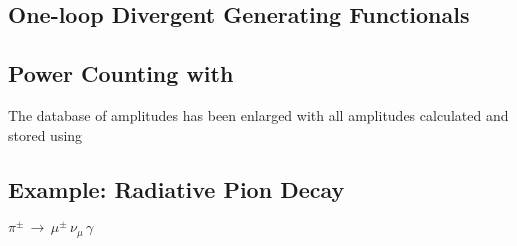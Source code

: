 \subsection{One-loop Divergent Generating Functionals}

\subsection{Power Counting with \fa}

The database of amplitudes has been enlarged with all amplitudes calculated and stored using 

\subsection{Example: Radiative Pion Decay}

$\pi^\pm \, \rightarrow  \, \mu^\pm \, \nu_\mu \, \gamma$

